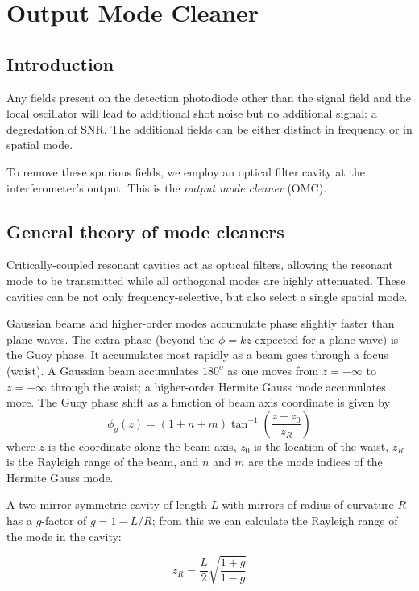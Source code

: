 \chapter{Output Mode Cleaner}
\label{chapter4}
\section{Introduction}
Any fields present on the detection photodiode other than the signal
field and the local oscillator will lead to additional shot noise but
no additional signal: a degredation of SNR.  The additional fields can
be either distinct in frequency or in spatial mode. 

To remove these spurious fields, we employ an optical filter cavity at
the interferometer's output. This is the \emph{output mode cleaner}
(OMC).  

\section{General theory of mode cleaners}

Critically-coupled resonant cavities act as optical filters, allowing
the resonant mode to be transmitted while all orthogonal modes are
highly attenuated.  These cavities can be not only
frequency-selective, but also select a single spatial mode.

Gaussian beams and higher-order modes accumulate phase slightly faster
than plane waves.  The extra phase (beyond the $\phi=kz$ expected for
a plane wave) is the Guoy phase.  It accumulates most rapidly as a
beam goes through a focus (waist). A Gaussian beam accumulates
$180^o$ as one moves from $z=-\infty$ to $z=+\infty$ through the
waist; a higher-order Hermite Gauss mode accumulates more.  The Guoy
phase shift as a function of beam axis coordinate is given by
%
\begin{equation}
\phi_g(z) = \left(1 + n + m\right) \tan^{-1} \left( \frac{z - z_0}{z_R} \right)
\label{eq:guoy-phase}
\end{equation}
%
where $z$ is the coordinate along the beam axis, $z_0$ is the location
of the waist, $z_R$ is the Rayleigh range of the beam, and $n$ and $m$
are the mode indices of the Hermite Gauss mode.

A two-mirror symmetric cavity of length $L$ with mirrors of radius of
curvature $R$ has a $g$-factor of $g = 1 - L/R$; from this we can
calculate the Rayleigh range of the mode in the cavity:

\begin{equation}
z_R = \frac{L}{2}\sqrt{\frac{1 + g}{1 - g}}
\end{equation}

